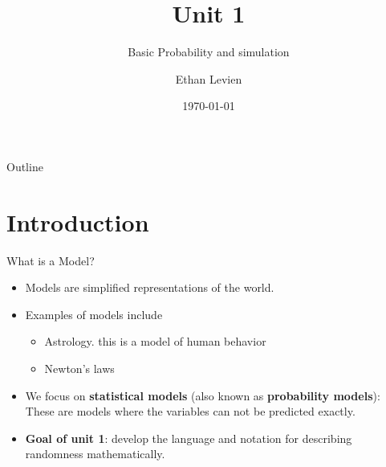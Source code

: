 

 \title{Unit 1}
 \subtitle{Basic Probability and simulation}
 \author{Ethan Levien}
 \date{\today}





\begin{frame}
  \titlepage
\end{frame}

\begin{frame}{Outline}
  \tableofcontents
\end{frame}

\section{Introduction}
\begin{frame}{What is a Model?}
  \begin{itemize}
    \item Models are simplified representations of the world.
    \item Examples of models include
      \begin{itemize}
        \item Astrology. this is a model of human behavior
        \item Newton’s laws
      \end{itemize}
    \item We focus on \textbf{statistical models} (also known as \textbf{probability models}): These are models where the variables can not be predicted exactly. 
    \item {\bf Goal of unit 1}: develop the language and notation for describing randomness mathematically. 
  \end{itemize}
\end{frame}

